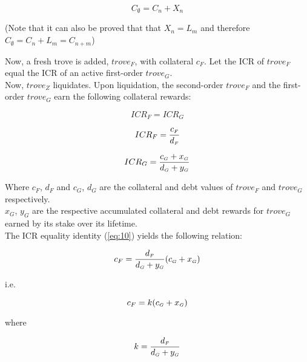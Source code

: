 \documentclass[reqno]{article}
\begin{document}
\begin{equation} \label{eq:9}
    C_\emptyset=C_n+X_n
\end{equation}

\bigskip
(Note that it can also be proved that that $X_n=L_m$ and therefore $C_\emptyset=C_n+L_m=C_{n+m}$)

\bigskip
Now, a fresh trove is added, $trove_F$, with collateral $c_F$.  Let the ICR of $trove_F$ equal the ICR of an active first-order $trove_G$.\\

Now, $trove_Z$ liquidates. Upon liquidation, the second-order $trove_F$ and the first-order $trove_G$ earn the following collateral rewards:

\begin{equation} \label{eq:10}
    ICR_F=ICR_G
\end{equation}

\begin{equation} 
    ICR_F=\frac{c_\mathsmaller{F}}{d_\mathsmaller{F}}
\end{equation}

\begin{equation} 
    ICR_G=\frac{c_\mathsmaller{G}+x_\mathsmaller{G}}{d_\mathsmaller{G}+y_\mathsmaller{G}}
\end{equation}

\bigskip
Where $c_F$, $d_F$ and $c_G$, $d_G$ are the collateral and debt values of $trove_F$ and $trove_G$ respectively.\\

$x_G$, $y_G$ are the respective accumulated collateral and debt rewards for $trove_G$ earned by its stake over its lifetime.\\

The ICR equality identity (\ref{eq:10}) yields the following relation:

\begin{equation} 
        c_F=\frac{d_\mathsmaller{F}}{d_\mathsmaller{G}+y_\mathsmaller{G}}(c_\mathsmaller{G}+x_\mathsmaller{G})
\end{equation}

\bigskip
i.e.

\begin{equation} \label{eq:14}
    c_F=k(c_\mathsmaller{G}+x_\mathsmaller{G})
\end{equation}

\bigskip
where

\begin{equation} \label{eq:15}
    k=\frac{d_\mathsmaller{F}}{d_\mathsmaller{G}+y_\mathsmaller{G}}
\end{equation}
\end{document}
